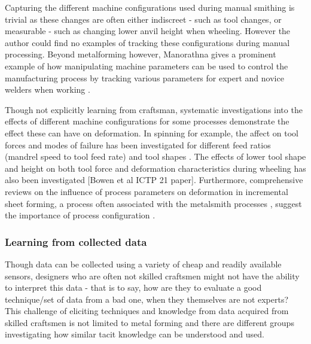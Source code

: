 Capturing the different machine configurations used during  manual smithing is trivial as these changes are often either indiscreet - such as tool changes, or measurable - such as changing lower anvil height when wheeling. However the author could find no examples of tracking these configurations during manual processing. Beyond metalforming however, Manorathna gives a prominent example of how manipulating machine parameters can be used to control the manufacturing process by tracking various parameters for expert and novice welders when working \citep{Manorathna2017HumanAutomation}. 

Though not explicitly learning from craftsman, systematic investigations into the effects of different machine configurations for some processes demonstrate the effect these can have on deformation. In spinning for example, the affect on tool forces and modes of failure has been investigated for different feed ratios (mandrel speed to tool feed rate) \citep{Sugar2016AnalysisSteels,Essa2010OptimizationAnalysis} and tool shapes \citep{El-Khabeery1991OnCups,Essa2010OptimizationAnalysis}. The effects of lower tool shape and height on both tool force and deformation characteristics during wheeling has also been investigated [Bowen et al ICTP 21 paper]. Furthermore, comprehensive reviews on the influence of process parameters on deformation in incremental sheet forming, a process often associated with the metalsmith processes \citep{Music2012TheTools}, suggest the importance of process configuration \citep{Gatea2016ReviewForming,Gohil2021ReviewProcess}.

\subsubsection{Learning from collected data}
Though data can be collected using a variety of cheap and readily available sensors, designers who are often not skilled craftsmen might not have the ability to interpret this data - that is to say, how are they to evaluate a good technique/set of data from a bad one, when they themselves are not experts? 
This challenge of eliciting techniques and knowledge from data acquired from skilled craftsmen is not limited to metal forming and there are different groups investigating how similar tacit knowledge can be understood and used.

